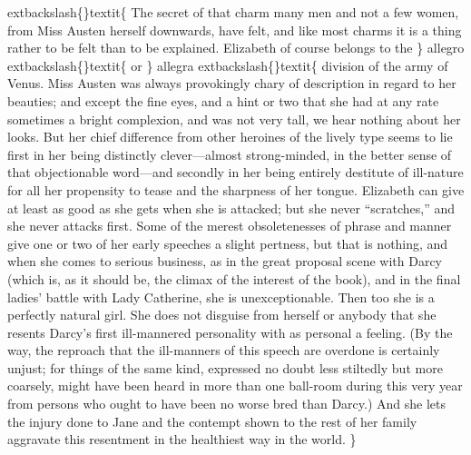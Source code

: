 \documentclass[10pt]{book}
\begin{document}
	extbackslash\{\}textit\{
    The secret of that charm many men and not a few women, from Miss Austen
herself downwards, have felt, and like most charms it is a thing rather
to be felt than to be explained. Elizabeth of course belongs to the
   \}
   allegro
   	extbackslash\{\}textit\{
    or
   \}
   allegra
   	extbackslash\{\}textit\{
    division of the army of Venus. Miss Austen was
always provokingly chary of description in regard to her beauties; and
except the fine eyes, and a hint or two that she had at any rate
sometimes a bright complexion, and was not very tall, we hear nothing
about her looks. But her chief difference from other heroines of the
lively type seems to lie first in her being distinctly clever—almost
strong-minded, in the better sense of that objectionable word—and
secondly in her being entirely destitute of ill-nature for all her
propensity to tease and the sharpness of her tongue. Elizabeth can give
at least as good as she gets when she is attacked; but she never
“scratches,” and she never attacks first. Some of the merest
obsoletenesses of phrase and
    manner give one or two of her early
speeches a slight pertness, but that is nothing, and when she comes to
serious business, as in the great proposal scene with Darcy (which is,
as it should be, the climax of the interest of the book), and in the
final ladies’ battle with Lady Catherine, she is unexceptionable. Then
too she is a perfectly natural girl. She does not disguise from herself
or anybody that she resents Darcy’s first ill-mannered personality with
as personal a feeling. (By the way, the reproach that the ill-manners of
this speech are overdone is certainly unjust; for things of the same
kind, expressed no doubt less stiltedly but more coarsely, might have
been heard in more than one ball-room during this very year from persons
who ought to have been no worse bred than Darcy.) And she lets the
injury done to Jane and the contempt shown to the rest of her family
aggravate this resentment in the healthiest way in the world.
   \}
\end{document}
